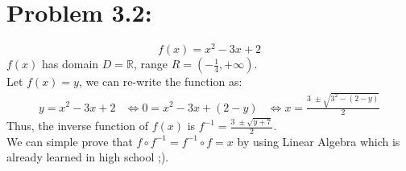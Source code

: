 \documentclass{article}
\newcommand{\R}{\mathbb{R}}
\begin{document}
	\section{Problem 3.2:}
		\begin{equation*}
			f(x)= x^2 - 3x + 2
		\end{equation*}
		$f(x)$ has domain $D = \R$, range $R = (-\frac{1}{4}, +\infty)$.\\
		Let $f(x) = y$, we can re-write the function as:
		\begin{align*}
			y = x^2 -3x+2 &\iff 0 = x^2 - 3x + (2-y)
			&\iff x = \frac{3 \; \pm \sqrt{3^2 - (2 -y)}}{2}
		\end{align*}
		Thus, the inverse function of $f(x)$ is $f^{-1} = \frac{3 \; \pm \sqrt{y+7}}{2}$.\\
		We can simple prove that $f \circ f^{-1} = f^{-1} \circ f = x$ by using Linear Algebra which is already learned in high school ;).
\end{document}
